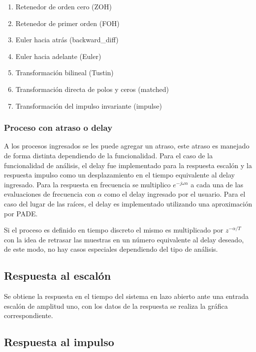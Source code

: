         \begin{enumerate}[leftmargin=\parindent]
            \item Retenedor de orden cero (ZOH)
            \item Retenedor de primer orden (FOH)
            \item Euler hacia atrás (backward\_diff)
            \item Euler hacia adelante (Euler)
            \item Transformación bilineal (Tustin)
            \item Transformación directa de polos y ceros (matched)
            \item Transformación del impulso invariante (impulse)
        \end{enumerate}

    \subsubsection{Proceso con atraso o delay}
        
        A los procesos ingresados se les puede agregar un atraso, este atraso es manejado de forma distinta dependiendo de la funcionalidad. Para el caso de la funcionalidad de análisis, el delay fue implementado para la respuesta escalón y la respuesta impulso como un desplazamiento en el tiempo equivalente al delay ingresado. Para la respuesta en frecuencia se multiplico $e^{-j\omega \alpha}$ a cada una de las evaluaciones de frecuencia con $\alpha$ como el delay ingresado por el usuario. Para el caso del lugar de las raíces, el delay es implementado utilizando una aproximación por PADE.

        Si el proceso es definido en tiempo discreto el mismo es multiplicado por $z^{-\alpha/T}$ con la idea de retrasar las muestras en un número equivalente al delay deseado, de este modo, no hay casos especiales dependiendo del tipo de análisis.

    \subsection{Respuesta al escalón}
        
        Se obtiene la respuesta en el tiempo del sistema en lazo abierto ante una entrada escalón de amplitud uno, con los datos de la respuesta se realiza la gráfica correspondiente.
    
    \subsection{Respuesta al impulso}
        
